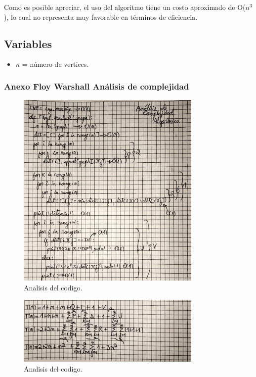 Como es posible apreciar, el uso del algoritmo tiene un costo aproximado de O($n^3$), lo cual no representa muy favorable en términos de eficiencia.

\subsection*{Variables}

\begin{itemize}
    \item \( n \) = número de vertices.
\end{itemize}

\subsubsection{Anexo Floy Warshall Análisis de complejidad}
\begin{figure}[H]
	\centering
	\includegraphics[width=0.8\textwidth]{complejidad_distancia_ejem1_1.png}
	\caption{Analisis del codigo.}
	\label{fig:complejidad1}
\end{figure}
\begin{figure}[H]
	\centering
	\includegraphics[width=0.8\textwidth]{complejidad_distancia_ejem1_2.png}
	\caption{Analisis del codigo.}
	\label{fig:complejidad1}
\end{figure}
